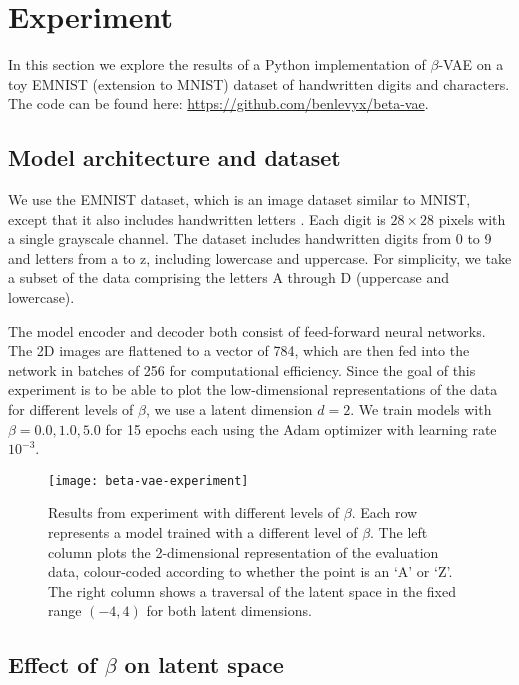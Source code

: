 \section{Experiment}

In this section we explore the results of a Python implementation of $\beta$-VAE on a toy EMNIST (extension to MNIST) dataset of handwritten digits and characters. The code can be found here: \url{https://github.com/benlevyx/beta-vae}.

\subsection{Model architecture and dataset}

We use the EMNIST dataset, which is an image dataset similar to MNIST, except that it also includes handwritten letters \cite{cohen2017emnist}. Each digit is $28\times 28$ pixels with a single grayscale channel. The dataset includes handwritten digits from 0 to 9 and letters from a to z, including lowercase and uppercase. For simplicity, we take a subset of the data comprising the letters A through D (uppercase and lowercase).

The model encoder and decoder both consist of feed-forward neural networks. The 2D images are flattened to a vector of 784, which are then fed into the network in batches of 256 for computational efficiency. Since the goal of this experiment is to be able to plot the low-dimensional representations of the data for different levels of $\beta$, we use a latent dimension $d=2$. We train models with $\beta=0.0, 1.0, 5.0$ for 15 epochs each using the Adam optimizer with learning rate $10^{-3}$.

\begin{figure}[h!]
    \centering
    \texttt{[image: beta-vae-experiment]}
    \caption{Results from experiment with different levels of $\beta$. Each row represents a model trained with a different level of $\beta$. The left column plots the 2-dimensional representation of the evaluation data, colour-coded according to whether the point is an `A' or `Z'. The right column shows a traversal of the latent space in the fixed range $(-4,4)$ for both latent dimensions.}
    \label{fig:beta-vae-experiment}
\end{figure}

\subsection{Effect of $\beta$ on latent space}


